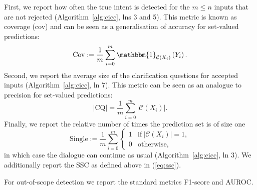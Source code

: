 \documentclass[11pt]{article}
\begin{document}
First, we report how often the true intent is detected for the $m \leq n$ inputs that are not rejected (Algorithm~\ref{alg:cicc}, lns 3 and 5). This metric is known as coverage (cov) and can be seen as a generalisation of accuracy for set-valued predictions:
\begin{equation}
    \label{eq:cov}
    \text{Cov} := \frac{1}{m} \sum_{i=0}^m \mathbbm{1}_{\mathcal{C}(X_i)}\left(Y_i\right).
\end{equation}
Second, we report the average size of the clarification questions for accepted inputs (Algorithm~\ref{alg:cicc}, ln 7). This metric can be seen as an analogue to precision for set-valued predictions:
\begin{equation}
    |\text{CQ}| = \frac{1}{m} \sum_{i=0}^m |\mathcal{C}(X_i)|.
\end{equation}
Finally, we report the relative number of times the prediction set is of size one
\begin{equation}
    \text{Single} := \frac{1}{m} \sum_{i=0}^m
        \begin{cases}
            1 & \text{if}~|\mathcal{C}(X_i)| = 1, \\
            0 & \text{otherwise,}
        \end{cases}
\end{equation}
in which case the dialogue can continue as usual (Algorithm~\ref{alg:cicc}, ln 3). We additionally report the SSC as defined above in (\ref{eq:ssc}).

For out-of-scope detection we report the standard metrics F1-score and AUROC.

\end{document}
